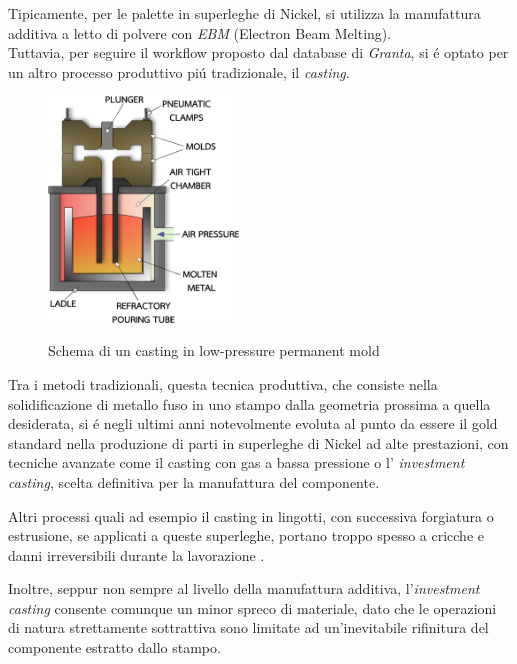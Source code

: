 \documentclass{article}
\begin{document}
    Tipicamente, per le palette in superleghe di Nickel, si utilizza la manufattura additiva
    a letto di polvere con \textit{EBM} (Electron Beam Melting). \\ 

    Tuttavia, per seguire il workflow proposto dal database di \textit{Granta}, si é optato
    per un altro processo produttivo piú tradizionale, il \textit{casting}. 

    \begin{figure}[h!]
        \centering
         \label{low_press_mold}
        \includegraphics[width=0.45\textwidth]{Sources/pressurized_mold.eps}
        \caption{Schema di un casting in low-pressure permanent mold \autocite{Inkscape}}
    \end{figure}


    Tra i metodi tradizionali, questa tecnica produttiva, che consiste nella solidificazione di metallo fuso
    in uno stampo dalla geometria prossima a quella desiderata, si é negli ultimi anni notevolmente evoluta
    al punto da essere il gold standard nella
    produzione di parti in superleghe di Nickel ad alte prestazioni, con tecniche avanzate come il casting con
    gas a bassa pressione o l' \textit{investment casting}, scelta definitiva per la manufattura del componente. 

    Altri processi quali ad esempio il casting in lingotti, con successiva forgiatura o estrusione, se applicati a queste superleghe,
    portano troppo spesso a cricche e danni irreversibili durante la lavorazione \autocite{Mouritz}.

    Inoltre, seppur non sempre al livello della manufattura additiva, l'\textit{investment casting} consente comunque un minor spreco 
    di materiale, dato che le operazioni di natura strettamente sottrattiva sono limitate ad un'inevitabile
    rifinitura del componente estratto dallo stampo. 
\end{document}
